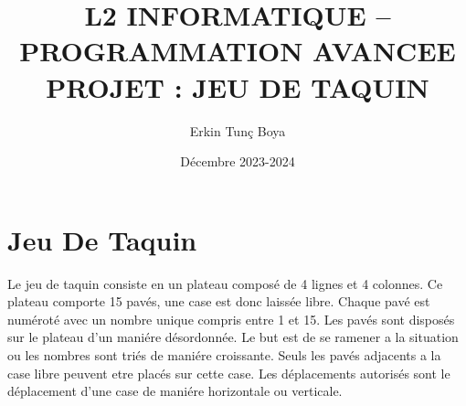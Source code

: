 \documentclass{article}
\title{L2 INFORMATIQUE – PROGRAMMATION AVANCEE \\ PROJET : JEU DE TAQUIN}
\author{Erkin Tunç Boya}
\date{Décembre 2023-2024}
\begin{document}
\maketitle
\tableofcontents
\newpage


\section{Jeu De Taquin}
Le jeu de taquin consiste en un
plateau composé de 4 lignes et 4 colonnes. Ce plateau comporte 15 pavés, une case est donc
laissée libre. Chaque pavé est numéroté avec un nombre unique compris entre 1 et 15.
Les pavés sont disposés sur le plateau d’un maniére désordonnée. Le but est de se ramener a la
situation ou les nombres sont triés de maniére croissante. Seuls les pavés adjacents a la case libre
peuvent etre placés sur cette case. Les déplacements autorisés sont le déplacement d’une case de
maniére horizontale ou verticale.

\end{document}
